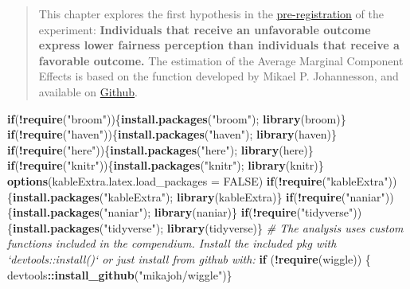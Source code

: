 \documentclass[]{book}
\newenvironment{Shaded}{\begin{snugshade}}{\end{snugshade}}
\newcommand{\KeywordTok}[1]{\textcolor[rgb]{0.13,0.29,0.53}{\textbf{#1}}}
\newcommand{\DataTypeTok}[1]{\textcolor[rgb]{0.13,0.29,0.53}{#1}}
\newcommand{\StringTok}[1]{\textcolor[rgb]{0.31,0.60,0.02}{#1}}
\newcommand{\CommentTok}[1]{\textcolor[rgb]{0.56,0.35,0.01}{\textit{#1}}}
\newcommand{\OtherTok}[1]{\textcolor[rgb]{0.56,0.35,0.01}{#1}}
\newcommand{\ControlFlowTok}[1]{\textcolor[rgb]{0.13,0.29,0.53}{\textbf{#1}}}
\newcommand{\OperatorTok}[1]{\textcolor[rgb]{0.81,0.36,0.00}{\textbf{#1}}}
\newcommand{\NormalTok}[1]{#1}
\begin{document}
\begin{quote}
This chapter explores the first hypothesis in the
\href{GoogLoser_Prereg_3_\#16823\%5B16065\%5D.pdf}{pre-registration} of
the experiment: \textbf{Individuals that receive an unfavorable outcome
express lower fairness perception than individuals that receive a
favorable outcome.} The estimation of the Average Marginal Component
Effects is based on the function developed by Mikael P. Johannesson, and
available on
\href{https://rdrr.io/github/mikajoh/descr2/man/amce.html}{Github}.
\end{quote}

\begin{Shaded}
\begin{Highlighting}[]
\ControlFlowTok{if}\NormalTok{(}\OperatorTok{!}\KeywordTok{require}\NormalTok{(}\StringTok{"broom"}\NormalTok{))\{}\KeywordTok{install.packages}\NormalTok{(}\StringTok{"broom"}\NormalTok{);  }\KeywordTok{library}\NormalTok{(broom)\}}
\ControlFlowTok{if}\NormalTok{(}\OperatorTok{!}\KeywordTok{require}\NormalTok{(}\StringTok{"haven"}\NormalTok{))\{}\KeywordTok{install.packages}\NormalTok{(}\StringTok{"haven"}\NormalTok{);  }\KeywordTok{library}\NormalTok{(haven)\}}
\ControlFlowTok{if}\NormalTok{(}\OperatorTok{!}\KeywordTok{require}\NormalTok{(}\StringTok{"here"}\NormalTok{))\{}\KeywordTok{install.packages}\NormalTok{(}\StringTok{"here"}\NormalTok{);  }\KeywordTok{library}\NormalTok{(here)\}}
\ControlFlowTok{if}\NormalTok{(}\OperatorTok{!}\KeywordTok{require}\NormalTok{(}\StringTok{"knitr"}\NormalTok{))\{}\KeywordTok{install.packages}\NormalTok{(}\StringTok{"knitr"}\NormalTok{);  }\KeywordTok{library}\NormalTok{(knitr)\}}
\KeywordTok{options}\NormalTok{(}\DataTypeTok{kableExtra.latex.load_packages =} \OtherTok{FALSE}\NormalTok{) }
\ControlFlowTok{if}\NormalTok{(}\OperatorTok{!}\KeywordTok{require}\NormalTok{(}\StringTok{"kableExtra"}\NormalTok{))\{}\KeywordTok{install.packages}\NormalTok{(}\StringTok{"kableExtra"}\NormalTok{);  }\KeywordTok{library}\NormalTok{(kableExtra)\}}
\ControlFlowTok{if}\NormalTok{(}\OperatorTok{!}\KeywordTok{require}\NormalTok{(}\StringTok{"naniar"}\NormalTok{))\{}\KeywordTok{install.packages}\NormalTok{(}\StringTok{"naniar"}\NormalTok{);  }\KeywordTok{library}\NormalTok{(naniar)\}}
\ControlFlowTok{if}\NormalTok{(}\OperatorTok{!}\KeywordTok{require}\NormalTok{(}\StringTok{"tidyverse"}\NormalTok{))\{}\KeywordTok{install.packages}\NormalTok{(}\StringTok{"tidyverse"}\NormalTok{);  }\KeywordTok{library}\NormalTok{(tidyverse)\}}
\CommentTok{# The analysis uses custom functions included in the compendium. Install the included pkg with `devtools::install()` or just install from github with:}
\ControlFlowTok{if}\NormalTok{ (}\OperatorTok{!}\KeywordTok{require}\NormalTok{(wiggle)) \{  devtools}\OperatorTok{::}\KeywordTok{install_github}\NormalTok{(}\StringTok{"mikajoh/wiggle"}\NormalTok{)\}}


\end{Highlighting}
\end{Shaded}
\end{document}

